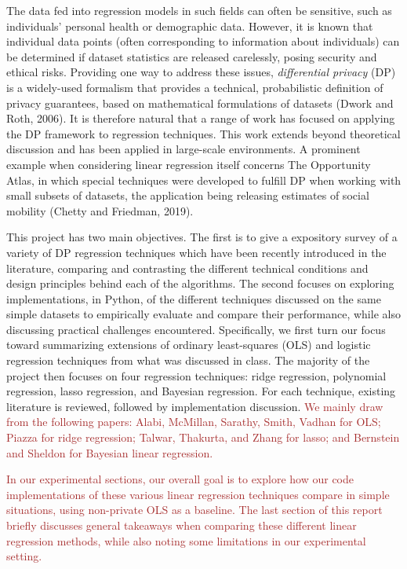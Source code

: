 \documentclass[11pt,conference]{IEEEtran}
\begin{document}
The data fed into regression models in such fields can often be sensitive, such as individuals' personal health or demographic data. However, it is known that individual data points (often corresponding to information about individuals) can be determined if dataset statistics are released carelessly, posing security and ethical risks. Providing one way to address these issues, \textit{differential privacy} (DP) is a widely-used formalism that provides a technical, probabilistic definition of privacy guarantees, based on mathematical formulations of datasets (Dwork and Roth, 2006). It is therefore natural that a range of work has focused on applying the DP framework to regression techniques. This work extends beyond theoretical discussion and has been applied in large-scale environments. A prominent example when considering linear regression itself concerns The Opportunity Atlas, in which special techniques were developed to fulfill DP when working with small subsets of datasets, the application being releasing estimates of social mobility (Chetty and Friedman, 2019).

This project has two main objectives. The first is to give a expository survey of a variety of DP regression techniques which have been recently introduced in the literature, comparing and contrasting the different technical conditions and design principles behind each of the algorithms. The second focuses on exploring implementations, in Python, of the different techniques discussed on the same simple datasets to empirically evaluate and compare their performance, while also discussing practical challenges encountered. Specifically, we first turn our focus toward summarizing extensions of ordinary least-squares (OLS) and logistic regression techniques from what was discussed in class. The majority of the project then focuses on four regression techniques: ridge regression, polynomial regression, lasso regression, and Bayesian regression. For each technique, existing literature is reviewed, followed by implementation discussion. \textcolor{brown}{We mainly draw from the following papers: Alabi, McMillan, Sarathy, Smith, Vadhan for OLS; Piazza for ridge regression; Talwar, Thakurta, and Zhang for lasso; and Bernstein and Sheldon for Bayesian linear regression.}

\textcolor{brown}{In our experimental sections, our overall goal is to explore how our code implementations of these various linear regression techniques compare in simple situations, using non-private OLS as a baseline. The last section of this report briefly discusses general takeaways when comparing these different linear regression methods, while also noting some limitations in our experimental setting.}
\end{document}

